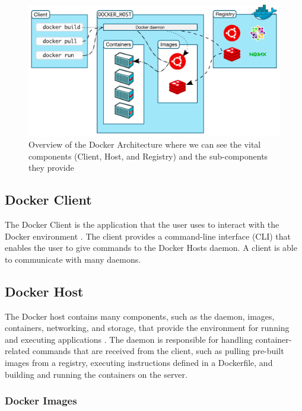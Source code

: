 \documentclass[fleqn,12pt]{olplainarticle}
\begin{document}
\begin{figure}[h]
    \centering
    \includegraphics[width=1\textwidth]{docker-overview}
    \caption{Overview of the Docker Architecture where we can see the vital components (Client, Host, and Registry) and the sub-components they provide \citep{docker:overview}}
    \label{fig:overview}
\end{figure}

\subsection{Docker Client}

The Docker Client is the application that the user uses to interact with the Docker environment \citep{aquasec:docker_architecture}. The client provides a command-line interface (CLI) that enables the user to give commands to the Docker Hosts daemon. A client is able to communicate with many daemons.

\subsection{Docker Host}

The Docker host contains many components, such as the daemon, images, containers, networking, and storage, that provide the environment for running and executing applications \citep{aquasec:docker_architecture}. The daemon is responsible for handling container-related commands that are received from the client, such as pulling pre-built images from a registry, executing instructions defined in a Dockerfile, and building and running the containers on the server.

\subsubsection{Docker Images}
\end{document}
